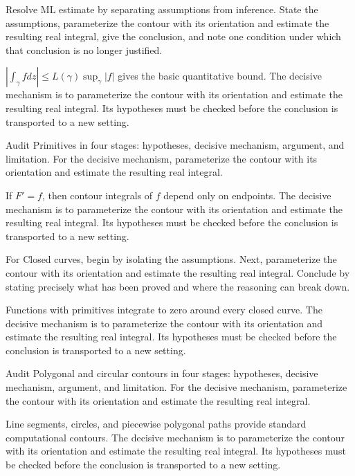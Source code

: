 \begin{problem}\label{prob:iv04-problem-04}
Resolve ML estimate by separating assumptions from inference. State the assumptions, parameterize the contour with its orientation and estimate the resulting real integral, give the conclusion, and note one condition under which that conclusion is no longer justified.
\end{problem}
\begin{solution}
$|\int_\gamma fdz|\le L(\gamma)\sup_\gamma|f|$ gives the basic quantitative bound. The decisive mechanism is to parameterize the contour with its orientation and estimate the resulting real integral. Its hypotheses must be checked before the conclusion is transported to a new setting.
\end{solution}

\begin{problem}\label{prob:iv04-problem-05}
Audit Primitives in four stages: hypotheses, decisive mechanism, argument, and limitation. For the decisive mechanism, parameterize the contour with its orientation and estimate the resulting real integral.
\end{problem}
\begin{solution}
If $F'=f$, then contour integrals of $f$ depend only on endpoints. The decisive mechanism is to parameterize the contour with its orientation and estimate the resulting real integral. Its hypotheses must be checked before the conclusion is transported to a new setting.
\end{solution}

\begin{problem}\label{prob:iv04-problem-06}
For Closed curves, begin by isolating the assumptions. Next, parameterize the contour with its orientation and estimate the resulting real integral. Conclude by stating precisely what has been proved and where the reasoning can break down.
\end{problem}
\begin{solution}
Functions with primitives integrate to zero around every closed curve. The decisive mechanism is to parameterize the contour with its orientation and estimate the resulting real integral. Its hypotheses must be checked before the conclusion is transported to a new setting.
\end{solution}

\begin{problem}\label{prob:iv04-problem-07}
Audit Polygonal and circular contours in four stages: hypotheses, decisive mechanism, argument, and limitation. For the decisive mechanism, parameterize the contour with its orientation and estimate the resulting real integral.
\end{problem}
\begin{solution}
Line segments, circles, and piecewise polygonal paths provide standard computational contours. The decisive mechanism is to parameterize the contour with its orientation and estimate the resulting real integral. Its hypotheses must be checked before the conclusion is transported to a new setting.
\end{solution}


